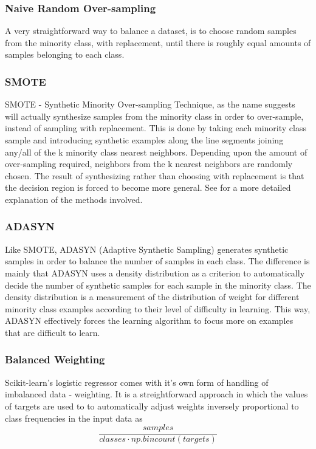 \subsubsection{Naive Random Over-sampling}
A very straightforward way to balance a dataset, is to choose random samples 
from the minority class, with replacement, until there is roughly equal
amounts of samples belonging to each class.

\subsubsection{SMOTE}
SMOTE - Synthetic Minority Over-sampling Technique, as the name suggests will
actually synthesize samples from the minority class in order to over-sample,
instead of sampling with replacement. This is done by taking each minority 
class sample and introducing synthetic examples along the line segments joining 
any/all of the k minority class nearest neighbors. Depending upon the amount of 
over-sampling required, neighbors from the k nearest neighbors are randomly
chosen. The result of synthesizing rather than choosing with replacement is
that the decision region is forced to become more general.
See \cite{smote-article} for a more detailed explanation of the methods
involved.

\subsubsection{ADASYN}
Like SMOTE, ADASYN (Adaptive Synthetic Sampling) generates synthetic samples
in order to balance the number of samples in each class. The difference is
mainly that ADASYN uses a density distribution as a criterion to automatically 
decide the number of synthetic samples for each sample in the minority class.
The density distribution is a measurement of the distribution of weight for 
different minority class examples according to their level of difficulty in
learning. This way, ADASYN effectively forces the learning algorithm to 
focus more on examples that are difficult to learn.

\subsubsection{Balanced Weighting}
Scikit-learn's logistic regressor comes with it's own form of handling of
imbalanced data - weighting. It is a streightforward approach in which 
the values of targets are used to to automatically adjust weights inversely 
proportional to class frequencies in the input data as 
$$\frac{samples}{classes \cdot np.bincount(targets)}$$

